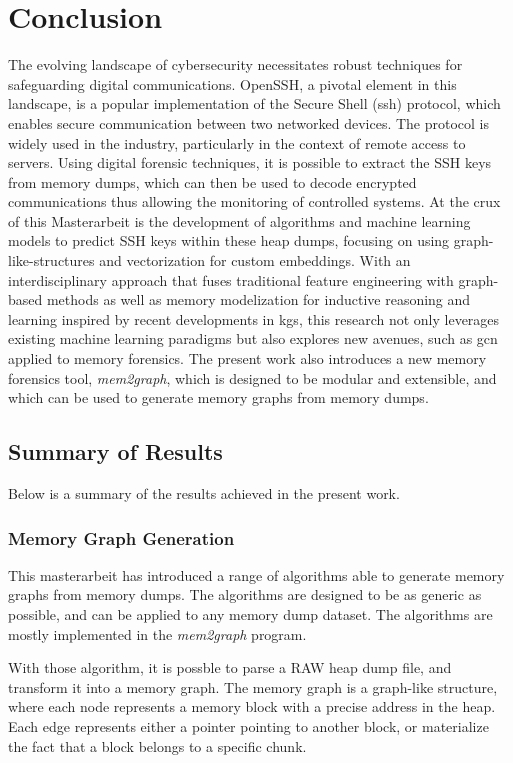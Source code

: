 \chapter{Conclusion}\label{chap:conclusion}


The evolving landscape of cybersecurity necessitates robust techniques for safeguarding digital communications. OpenSSH, a pivotal element in this landscape, is a popular implementation of the Secure Shell (\acrshort{ssh}) protocol, which enables secure communication between two networked devices. The protocol is widely used in the industry, particularly in the context of remote access to servers. Using digital forensic techniques, it is possible to extract the SSH keys from memory dumps, which can then be used to decode encrypted communications thus allowing the monitoring of controlled systems. At the crux of this Masterarbeit is the development of algorithms and machine learning models to predict SSH keys within these heap dumps, focusing on using graph-like-structures and vectorization for custom embeddings. With an interdisciplinary approach that fuses traditional feature engineering with graph-based methods as well as memory modelization for inductive reasoning and learning inspired by recent developments in \acrfull{kg}s, this research not only leverages existing machine learning paradigms but also explores new avenues, such as \acrfull{gcn} applied to memory forensics. The present work also introduces a new memory forensics tool, \textit{mem2graph}, which is designed to be modular and extensible, and which can be used to generate memory graphs from memory dumps. 

\section{Summary of Results}
Below is a summary of the results achieved in the present work.

\subsection{Memory Graph Generation}
This masterarbeit has introduced a range of algorithms able to generate memory graphs from memory dumps. The algorithms are designed to be as generic as possible, and can be applied to any memory dump dataset. The algorithms are mostly implemented in the \textit{mem2graph} program.

With those algorithm, it is possble to parse a RAW heap dump file, and transform it into a memory graph. The memory graph is a graph-like structure, where each node represents a memory block with a precise address in the heap. Each edge represents either a pointer pointing to another block, or materialize the fact that a block belongs to a specific chunk. 

